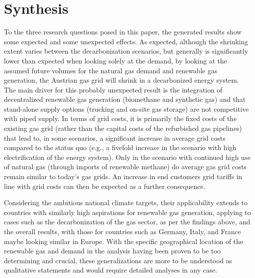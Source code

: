 \section{Synthesis}\label{synthesis}
To the three research questions posed in this paper, the generated results show some expected and some unexpected effects. As expected, although the shrinking extent varies between the decarbonization scenarios, but generally is significantly lower than expected when looking solely at the demand, by looking at the assumed future volumes for the natural gas demand and renewable gas generation, the Austrian gas grid will shrink in a decarbonized energy system. The main driver for this probably unexpected result is the integration of decentralized renewable gas generation (biomethane and synthetic gas) and that stand-alone supply options (trucking and on-site gas storage) are not competitive with piped supply. In terms of grid costs, it is primarily the fixed costs of the existing gas grid (rather than the capital costs of the refurbished gas pipelines) that lead to, in some scenarios, a significant increase in average grid costs compared to the status quo (e.g., a fivefold increase in the scenario with high electrification of the energy system). Only in the scenario with continued high use of natural gas (through imports of renewable methane) do average gas grid costs remain similar to today's gas grids. An increase in end customers grid tariffs in line with grid costs can then be expected as a further consequence.\vspace{0.3cm}

Considering the ambitious national climate targets, their applicability extends to countries with similarly high aspirations for renewable gas generation, applying to cases such as the decarbonization of the gas sector, as per the findings above, and the overall results, with those for countries such as Germany, Italy, and France maybe looking similar in Europe. With the specific geographical location of the renewable gas and demand in the analysis having been proven to be too determining and crucial, these generalizations are more to be understood as qualitative statements and would require detailed analyses in any case.\vspace{0.3cm}

